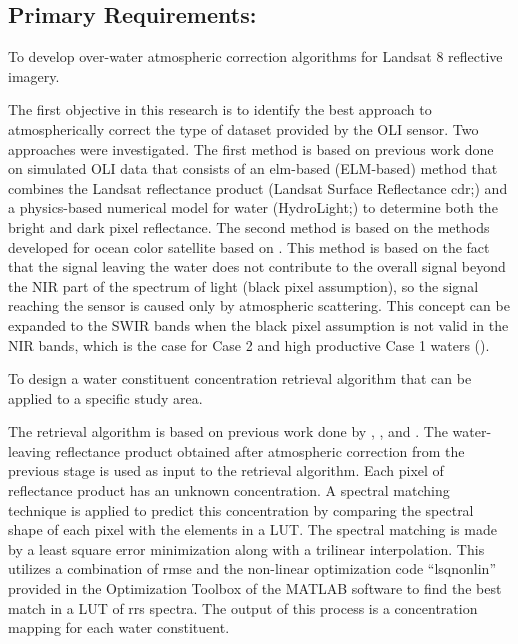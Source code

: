 \subsection{Primary Requirements:}
\begin{enumerate} 
	{\bf \item To develop over-water atmospheric correction algorithms for Landsat 8 reflective imagery.} 

The first objective in this research is to identify the best approach to atmospherically correct the type of dataset provided by the OLI sensor. Two approaches were investigated. The first method is based on previous work done on simulated OLI data \cite{Gerace:2013,Gerace:2012,GeraceThesis,Pahlevan:2012} that consists of an \acrfull{elm}-based (ELM-based) method that combines the Landsat reflectance product (Landsat Surface Reflectance \acrshort{cdr};\cite{LandsatCDR}) and a physics-based numerical model for water (HydroLight;\cite{MobleyHEtech}) to determine both the bright and dark pixel reflectance. The second method is based on the methods developed for ocean color satellite based on \cite{Gordon:1994}. This method is based on the fact that the signal leaving the water does not contribute to the overall signal beyond the NIR part of the spectrum of light (black pixel assumption), so the signal reaching the sensor is caused only by atmospheric scattering. This concept can be expanded to the SWIR bands when the black pixel assumption is not valid in the NIR bands, which is the case for Case 2 and high productive Case 1 waters (\cite{Wang:2007}).

	{\bf \item To design a water constituent concentration retrieval algorithm that can be applied to a specific study area.}

The retrieval algorithm is based on previous work done by \cite{Raqueno:2003}, \cite{GeraceThesis}, and \cite{Pahlevan:2012}. The water-leaving reflectance product obtained after atmospheric correction from the previous stage is used as input to the retrieval algorithm. Each pixel of reflectance product has an unknown concentration. A spectral matching technique is applied to predict this concentration by comparing the spectral shape of each pixel with the elements in a LUT. The spectral matching is made by a least square error minimization along with a trilinear interpolation. This utilizes a combination of \acrfull{rmse} and the non-linear optimization code ``lsqnonlin'' provided in the Optimization Toolbox of the MATLAB software \cite{MatlabHelp} to find the best match in a LUT of \gls{rrs} spectra. The output of this process is a concentration mapping for each water constituent.


\end{enumerate}
